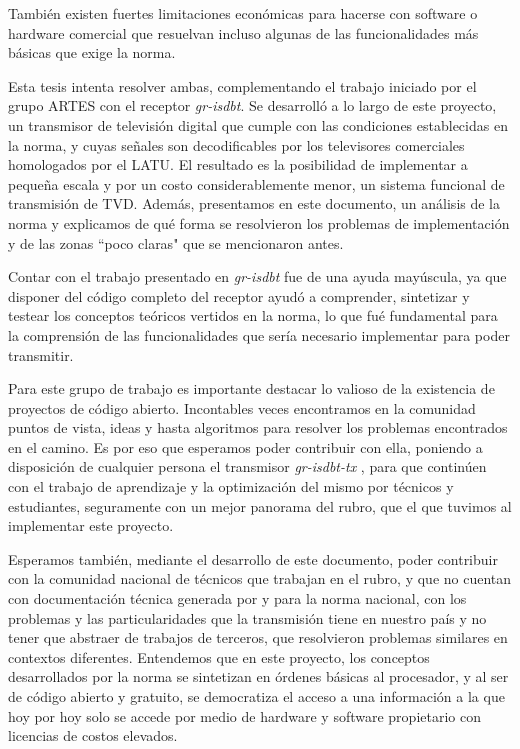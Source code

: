 También existen fuertes limitaciones económicas para hacerse con software o hardware comercial que resuelvan incluso algunas de las funcionalidades más básicas que exige la norma. 

Esta tesis intenta resolver ambas, complementando el trabajo iniciado por el grupo ARTES con el receptor \textit{gr-isdbt}. Se desarrolló a lo largo de este proyecto, un transmisor de televisión digital que cumple con las condiciones establecidas en la norma, y cuyas señales son decodificables por los televisores comerciales homologados por el \gls{LATU}. El resultado es la posibilidad de implementar a pequeña escala y por un costo considerablemente menor, un sistema funcional de transmisión de TVD. Además, presentamos en este documento, un análisis de la norma y explicamos de qué forma se resolvieron los problemas de implementación y de las zonas ``poco claras" que se mencionaron antes.

Contar con el trabajo presentado en \textit{gr-isdbt} fue de una ayuda mayúscula, ya que disponer del código completo del receptor ayudó a comprender, sintetizar y testear los conceptos teóricos vertidos en la norma, lo que fué fundamental para la comprensión de las funcionalidades que sería necesario implementar para poder transmitir. 

Para este grupo de trabajo es importante destacar lo valioso de la existencia de proyectos de código abierto. Incontables veces encontramos en la comunidad puntos de vista, ideas y hasta algoritmos para resolver los problemas encontrados en el camino. Es por eso que esperamos poder contribuir con ella, poniendo a disposición de cualquier persona el transmisor \textit{gr-isdbt-tx} \cite{gr-isdbt-tx}, para que continúen con el trabajo de aprendizaje y la optimización del mismo por técnicos y estudiantes, seguramente con un mejor panorama del rubro, que el que tuvimos al implementar este proyecto.

Esperamos también, mediante el desarrollo de este documento, poder contribuir con la comunidad nacional de técnicos que trabajan en el rubro, y que no cuentan con documentación técnica generada por y para la norma nacional, con los problemas y las particularidades que la transmisión tiene en nuestro país y no tener que abstraer de trabajos de terceros, que resolvieron problemas similares en contextos diferentes. Entendemos que en este proyecto, los conceptos desarrollados por la norma se sintetizan en órdenes básicas al procesador, y al ser de código abierto y gratuito, se democratiza el acceso a una información a la que hoy por hoy solo se accede por medio de hardware y software propietario con licencias de costos elevados.

